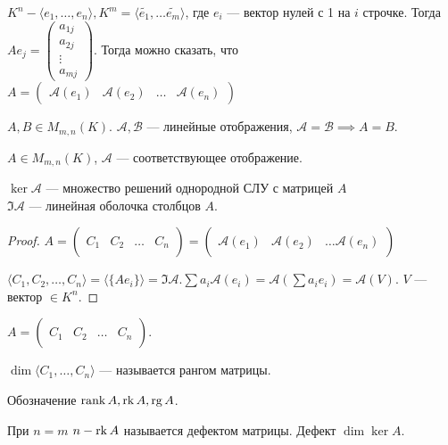 $K^n - \langle e_1, \ldots, e_n \rangle, K^m = \langle \widetilde{e_1}, \ldots \widetilde{e_m} \rangle$, где $e_i$ --- вектор нулей с 1 на  $i$ строчке. Тогда
$A e_j = \begin{pmatrix} a_{1j} \\ a_{2j} \\ \vdots \\ a_{mj} \end{pmatrix}$.
Тогда можно сказать, что $A = \left(\begin{array}{c|c|c|c} \mathcal{A}(e_1) & \mathcal{A}(e_2) & \ldots & \mathcal{A}(e_n) \end{array} \right)$

\begin{consequence}
    $A, B \in M_{m, n}(K)$.  $\mathcal{A}, \mathcal{B}$ --- линейные отображения,  $\mathcal{A} = \mathcal{B} \implies A = B$.
\end{consequence}
\begin{statement}
    $A \in M_{m, n}(K)$,  $\mathcal{A}$ --- соответствующее отображение.

    $\ker \mathcal{A}$ --- множество решений однородной СЛУ с матрицей  $A$\\
    $\Im \mathcal{A}$ --- линейная оболочка столбцов $A$.
\end{statement}
\begin{proof}
    $A = \left( \begin{array}{c|c|c|c} & &  \\ C_1 & C_2 & \ldots & C_n \\ & & \end{array} \right) = \left(\begin{array}{c|c|c} & &  \\ \mathcal{A}(e_1) & \mathcal{A}(e_2) & \ldots \mathcal{A}(e_n) \\ & & \end{array} \right)$

    $\langle C_1, C_2, \ldots, C_n \rangle = \langle \{A e_i \} \rangle = \Im \mathcal{A}. \sum a_i \mathcal{A}(e_i) = \mathcal{A}(\sum a_i e_i) = \mathcal{A}(V)$. $V$ --- вектор  $\in K^n$.
\end{proof}
\begin{definition}
    $A = \left( \begin{array}{c|c|c|c} & &  \\ C_1 & C_2 & \ldots & C_n \\ & & \end{array} \right)$.

    $\dim \langle C_1, \ldots, C_n \rangle$ --- называется рангом матрицы.

    Обозначение $\operatorname{rank} A, \operatorname{rk} A, \operatorname{rg} A$.

    При $n=m$  $n-\operatorname{rk} A$ называется  дефектом матрицы. Дефект $\dim \ker A$.
\end{definition}
